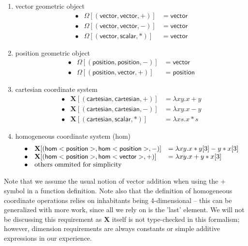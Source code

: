 \documentclass{article}
\newcommand{\Chi}{\mathbf{X}}
\begin{document}
\begin{enumerate}
	\item \textsf{vector} geometric object
	 \[\begin{array}{lll}%
		\bullet& \Omega[(\mathsf{vector},\mathsf{vector},+)]&=\mathsf{vector}\\
		\bullet&
		\Omega[(\mathsf{vector},\mathsf{vector},-)]&=\mathsf{vector}\\
		\bullet&
		\Omega[(\mathsf{vector},\mathsf{scalar},*)]&=\mathsf{vector}
	\end{array}\]
	
	\item \textsf{position} geometric object
	\[\begin{array}{lll}%
		\bullet& \Omega[(\mathsf{position},\mathsf{position},-)]&=\mathsf{vector}\\
		\bullet&
		\Omega[(\mathsf{position},\mathsf{vector},+)]&=\mathsf{position}	
	\end{array}\]
	
	\item \textsf{cartesian} coordinate system\\
	\[\begin{array}{lll}%
		\bullet& 
		\Chi[(\mathsf{cartesian},\mathsf{cartesian},+)]&=\lambda xy.x + y\\
		\bullet&
		\Chi[(\mathsf{cartesian},\mathsf{cartesian},-)]&=\lambda xy.x - y\\
		\bullet&
		\Chi[(\mathsf{cartesian},\mathsf{scalar},*)]&=\lambda xs.x * s
	\end{array}\]
	
	\item homogeneous coordinate system (\textsf{hom})\\
	\[\begin{array}{lll}%
		\bullet&
		\Chi[(\mathsf{hom}<\mathsf{position}>,\mathsf{hom}<\mathsf{position}>,-)]&=\lambda xy.x * y[3] - y * x[3]\\
		\bullet&
		\Chi[(\mathsf{hom}<\mathsf{position}>,\mathsf{hom}<\mathsf{vector}>,+)]&=\lambda xy.x + y * x[3]\\
		\bullet& 
		\textnormal{others ommited for simplicity}\\
	\end{array}\]
\end{enumerate}
Note that we assume the usual notion of vector addition when using the $+$ symbol in a function definition.
Note also that the definition of homogeneous coordinate operations relies on inhabitants being 4-dimensional -- this can be generalized with more work, since all we rely on is the 'last' element.
We will not be discussing this requirement as $\Chi$ itself is not type-checked in this formalism; however, dimension requirements are always constants or simple additive expressions in our experience.
\end{document}

